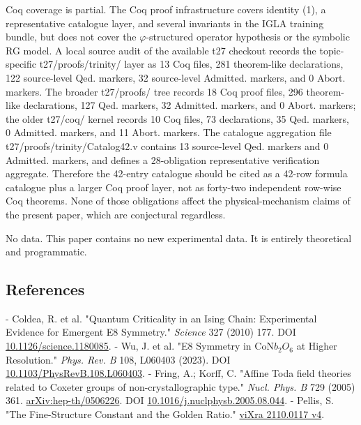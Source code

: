   Coq coverage is partial. The Coq proof infrastructure covers identity (1), a
  representative catalogue layer, and several invariants in the IGLA training bundle, but
  does not cover the $\varphi$-structured operator hypothesis or the symbolic RG model. A local
  source audit of the available t27 checkout records the topic-specific t27/proofs/trinity/
  layer as 13 Coq files, 281 theorem-like declarations, 122 source-level Qed. markers, 32
  source-level Admitted. markers, and 0 Abort. markers. The broader t27/proofs/ tree
  records 18 Coq proof files, 296 theorem-like declarations, 127 Qed. markers, 32
  Admitted. markers, and 0 Abort. markers; the older t27/coq/ kernel records 10 Coq
  files, 73 declarations, 35 Qed. markers, 0 Admitted. markers, and 11 Abort. markers.
  The catalogue aggregation file t27/proofs/trinity/Catalog42.v contains 13 source-level
  Qed. markers and 0 Admitted. markers, and defines a 28-obligation representative
  verification aggregate. Therefore the 42-entry catalogue should be cited as a 42-row
  formula catalogue plus a larger Coq proof layer, not as forty-two independent row-wise
  Coq theorems. None of those obligations affect the physical-mechanism claims of the
  present paper, which are conjectural regardless.

  No data. This paper contains no new experimental data. It is entirely theoretical and
  programmatic.

\subsection{References}

- Coldea, R. et al. "Quantum Criticality in an Ising Chain: Experimental Evidence for Emergent E8 Symmetry." \textit{Science} 327 (2010) 177. DOI \href{https://doi.org/10.1126/science.1180085}{10.1126/science.1180085}.
- Wu, J. et al. "E8 Symmetry in CoN$b_{2}$$O_{6}$ at Higher Resolution." \textit{Phys. Rev. B} 108, L060403 (2023). DOI \href{https://doi.org/10.1103/PhysRevB.108.L060403}{10.1103/PhysRevB.108.L060403}.
- Fring, A.; Korff, C. "Affine Toda field theories related to Coxeter groups of non-crystallographic type." \textit{Nucl. Phys. B} 729 (2005) 361. \href{https://arxiv.org/abs/hep-th/0506226}{arXiv:hep-th/0506226}. DOI \href{https://doi.org/10.1016/j.nuclphysb.2005.08.044}{10.1016/j.nuclphysb.2005.08.044}.
- Pellis, S. "The Fine-Structure Constant and the Golden Ratio." \href{https://vixra.org/pdf/2110.0117v4.pdf}{viXra 2110.0117 v4}.
